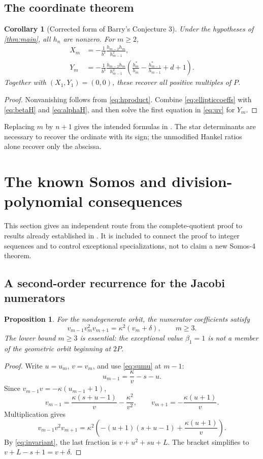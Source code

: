 \documentclass[11pt,letterpaper]{article}
\numberwithin{equation}{section}
\newtheorem{proposition}[theorem]{Proposition}
\newtheorem{corollary}[theorem]{Corollary}
\theoremstyle{definition}
\theoremstyle{remark}
\begin{document}
\subsection{The coordinate theorem}
\begin{corollary}[Corrected form of Barry's Conjecture 3]\label{cor:coordinates}
Under the hypotheses of \cref{thm:main}, all $h_n$ are nonzero. For $m\ge2$,
\begin{align}
 X_m&=-\frac1{b^2}\frac{h_{m-2}h_m}{h_{m-1}^2},\label{eq:XH}\\
 Y_m&=-\frac1{b^3}\frac{h_{m-2}h_m}{h_{m-1}^2}
 \left(\frac{h_m^*}{h_m}-\frac{h_{m-1}^*}{h_{m-1}}+d+1\right).
 \label{eq:YH}
\end{align}
Together with $(X_1,Y_1)=(0,0)$, these recover all positive multiples of $P$.
\end{corollary}
\begin{proof}
Nonvanishing follows from \eqref{eq:hproduct}. Combine
\eqref{eq:ellipticcoeffs} with \eqref{eq:betaH} and \eqref{eq:alphaH},
and then solve the first equation in \eqref{eq:uv} for $Y_m$.
\end{proof}

Replacing $m$ by $n+1$ gives the intended formulas in
\cite[Conjecture~3]{Barry2023}. The star determinants are necessary to
recover the ordinate with its sign; the unmodified Hankel ratios alone
recover only the abscissa.

\section{The known Somos and division-polynomial consequences}\label{sec:somos}

This section gives an independent route from the complete-quotient proof
to results already established in \cite[Theorems~5.4--5.5]{LWZ2026}.
It is included to connect the proof to integer sequences and to control
exceptional specializations, not to claim a new Somos-4 theorem.

\subsection{A second-order recurrence for the Jacobi numerators}
\begin{proposition}\label{prop:betasomos}
For the nondegenerate orbit, the numerator coefficients satisfy
\begin{equation}\label{eq:betasomos}
 v_{m-1}v_m^2v_{m+1}=\kappa^2(v_m+\delta),\qquad m\ge3.
\end{equation}
The lower bound $m\ge3$ is essential: the exceptional value $\beta_1=1$
is not a member of the geometric orbit beginning at $2P$.
\end{proposition}
\begin{proof}
Write $u=u_m$, $v=v_m$, and use \eqref{eq:sumu} at $m-1$:
\[
 u_{m-1}=\frac{\kappa}{v}-s-u.
\]
Since $v_{m-1}v=-\kappa(u_{m-1}+1)$,
\[
 v_{m-1}=\frac{\kappa(s+u-1)}{v}-\frac{\kappa^2}{v^2},
 \qquad v_{m+1}=-\frac{\kappa(u+1)}v.
\]
Multiplication gives
\[
 v_{m-1}v^2v_{m+1}
 =\kappa^2\left(-(u+1)(s+u-1)+\frac{\kappa(u+1)}v\right).
\]
By \eqref{eq:invariant}, the last fraction is $v+u^2+su+L$.
The bracket simplifies to $v+L-s+1=v+\delta$.
\end{proof}
\end{document}
